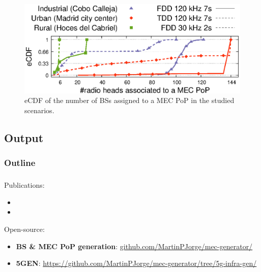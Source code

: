 \documentclass[aspectratio=169]{beamer}
\begin{document}
\begin{frame}

    \frametitle{\secname}
    \framesubtitle{\subsecname}

    \begin{figure}[t]
        \centering
        \includegraphics[width=.8\columnwidth]{img/cdfs}
        \vspace{1em}
        \caption{eCDF of the number of BSs assigned to a MEC PoP in the studied scenarios.}
        \label{fig:cdfs}
    \end{figure}
\end{frame}


\subsection{Output}
\begin{frame}
    \frametitle{Outline}
    \tableofcontents[subsectionstyle=show/shaded/hide,sectionstyle=show/shaded]
\end{frame}

\begin{frame}
    \frametitle{\secname}
    \framesubtitle{\subsecname}
    Publications:
    \begin{itemize}
        \item {}
        \item {}
    \end{itemize}
    Open-source:
    \begin{itemize}
        \item \textbf{BS \& MEC PoP generation}: \url{github.com/MartinPJorge/mec-generator/}
        \item \textbf{5GEN}: \url{https://github.com/MartinPJorge/mec-generator/tree/5g-infra-gen/}
    \end{itemize}
    

\end{frame}
\end{document}
